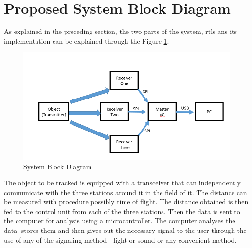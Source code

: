 \section{Proposed System Block Diagram}
As explained in the preceding section, the two parts of the system, \gls{rtls} ans its implementation can be explained through the Figure \ref{fig:BlockDiagram}.

\begin{figure}[htpb]
\centering
\includegraphics[scale=.34]{./Images/BlockDiagram.png}
\caption{System Block Diagram}
\label{fig:BlockDiagram}
\end{figure}

The object to be tracked is equipped with a transceiver that can independently communicate with the three stations around it in the field of it. The distance can be measured with procedure possibly time of flight. The distance obtained is then fed to the control unit from each of the three stations. Then the data is sent to the computer for analysis using a microcontroller. The computer analyses the data, stores them and then gives out the necessary signal to the user through the use of any of the signaling method -  light or sound or any convenient method.
